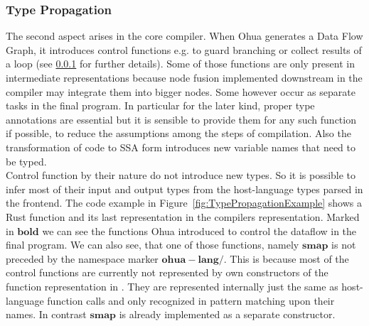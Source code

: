 \subsubsection{Type Propagation}
The second aspect arises in the core compiler. When Ohua generates a Data Flow Graph, it introduces control functions e.g. to guard branching or collect results of a loop (see \ref{} for further details). Some of those functions are only present in intermediate representations because node fusion implemented downstream in the compiler may integrate them into bigger nodes. Some however occur as separate tasks in the final program. In particular for the later kind, proper type annotations are essential but it is sensible to provide them for any such function if possible, to reduce the assumptions among the steps of compilation. Also the transformation of code to SSA form introduces new variable names that need to be typed.\\

Control function by their nature do not introduce new types. So it is possible to infer most of their input and output types from the host-language types parsed in the frontend. The code example in Figure~\ref{fig:TypePropagationExample} shows a Rust function and its last representation in the compilers  representation. Marked in $\mathbf{bold}$ we can see the functions Ohua introduced to control the dataflow in the final program. We can also see, that one of those functions, namely $\mathbf{smap}$ is not preceded by the namespace marker $\mathbf{ohua-lang/}$. This is because most of the control functions are currently not represented by own constructors of the function representation in . They are represented internally just the same as host-language function calls and only recognized in pattern matching upon their names. In contrast $\mathbf{smap}$ is already implemented as a separate constructor. 

